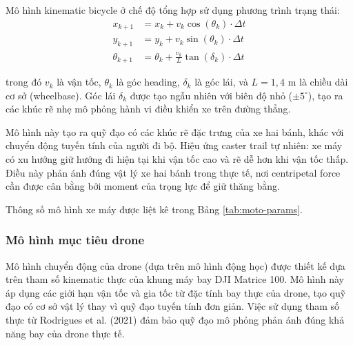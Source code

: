 Mô hình kinematic bicycle ở chế độ tổng hợp sử dụng phương trình trạng thái:
\begin{equation}
\begin{aligned}
x_{k+1} &= x_k + v_k \cos(\theta_k) \cdot \Delta t \\
y_{k+1} &= y_k + v_k \sin(\theta_k) \cdot \Delta t \\
\theta_{k+1} &= \theta_k + \frac{v_k}{L} \tan(\delta_k) \cdot \Delta t
\end{aligned}
\end{equation}

trong đó $v_k$ là vận tốc, $\theta_k$ là góc heading, $\delta_k$ là góc lái, và $L = 1{,}4$ m là chiều dài cơ sở (wheelbase). Góc lái $\delta_k$ được tạo ngẫu nhiên với biên độ nhỏ ($\pm 5^\circ$), tạo ra các khúc rẽ nhẹ mô phỏng hành vi điều khiển xe trên đường thẳng.

Mô hình này tạo ra quỹ đạo có các khúc rẽ đặc trưng của xe hai bánh, khác với chuyển động tuyến tính của người đi bộ. Hiệu ứng caster trail tự nhiên: xe máy có xu hướng giữ hướng đi hiện tại khi vận tốc cao và rẽ dễ hơn khi vận tốc thấp. Điều này phản ánh đúng vật lý xe hai bánh trong thực tế, nơi centripetal force cần được cân bằng bởi moment của trọng lực để giữ thăng bằng.

Thông số mô hình xe máy được liệt kê trong Bảng \ref{tab:moto-params}.

\begin{table}[H]
\centering
\caption{Thông số mô hình xe máy}
\label{tab:moto-params}
\end{table}

\subsubsection{Mô hình mục tiêu drone}

\hspace{0.5cm} Mô hình chuyển động của drone (dựa trên mô hình động học) được thiết kế dựa trên tham số kinematic thực của khung máy bay DJI Matrice 100. Mô hình này áp dụng các giới hạn vận tốc và gia tốc từ đặc tính bay thực của drone, tạo quỹ đạo có cơ sở vật lý thay vì quỹ đạo tuyến tính đơn giản. Việc sử dụng tham số thực từ Rodrigues et al. (2021) đảm bảo quỹ đạo mô phỏng phản ánh đúng khả năng bay của drone thực tế.

